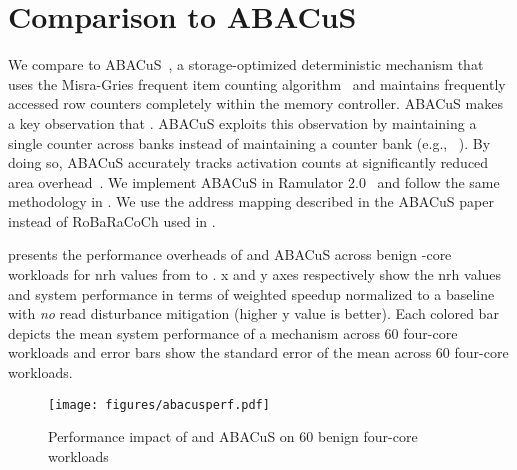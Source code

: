 \section{Comparison to ABACuS}
\label{apx:abacuscomparison}

We compare \X{} to ABACuS~\cite{olgun2024abacus}, a storage-optimized deterministic mechanism that uses the Misra-Gries frequent item counting algorithm~\cite{misra1982finding} and maintains frequently accessed row counters completely within the memory controller.
ABACuS makes a key observation that .
ABACuS exploits this observation by maintaining a single counter across  banks instead of maintaining a counter  bank (e.g., ~\cite{park2020graphene,bostanci2024comet}).
By doing so, ABACuS accurately tracks activation counts at significantly reduced area overhead~\cite{olgun2024abacus}.
We implement ABACuS in Ramulator 2.0~\cite{ramulator2github, chronusgithub} and follow the same methodology in .
We use the address mapping described in the ABACuS paper  instead of RoBaRaCoCh used in .

 presents the performance overheads of \X{} and ABACuS across  benign -core workloads for \gls{nrh} values from  to .
x and y axes respectively show the \gls{nrh} values and system performance in terms of weighted speedup normalized to a baseline with \emph{no} read disturbance mitigation (higher y value is better).
Each colored bar depicts the mean system performance of a mechanism across 60 four-core workloads and error bars show the standard error of the mean across 60 four-core workloads.

\begin{figure}[h]
\centering
\texttt{[image: figures/abacusperf.pdf]}
\caption{Performance impact of \X{} and ABACuS on 60 benign four-core workloads}
\label{fig:abacusperf}
\end{figure}

